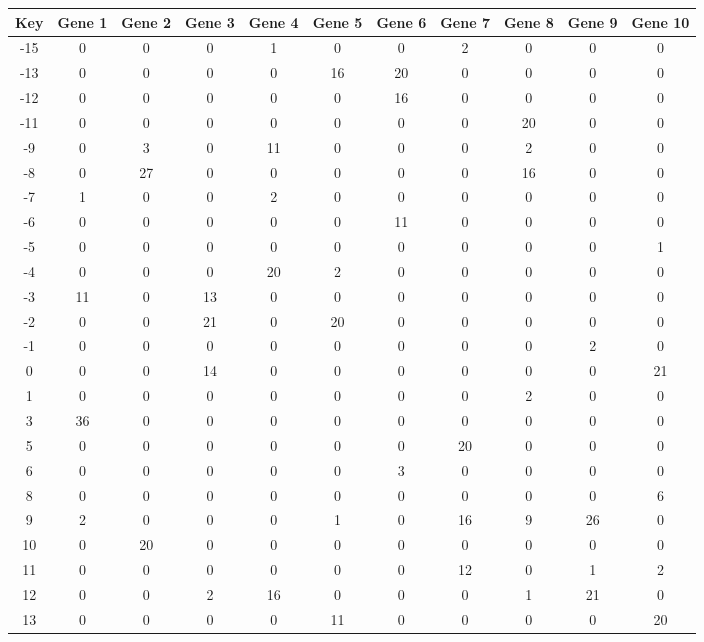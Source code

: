 \begin{tabular}{|c|c|c|c|c|c|c|c|c|c|c|}
\hline
Key & Gene 1 & Gene 2 & Gene 3 & Gene 4 & Gene 5 & Gene 6 & Gene 7 & Gene 8 & Gene 9 & Gene 10 \\
\hline
-15 & 0 & 0 & 0 & 1 & 0 & 0 & 2 & 0 & 0 & 0 \\
-13 & 0 & 0 & 0 & 0 & 16 & 20 & 0 & 0 & 0 & 0 \\
-12 & 0 & 0 & 0 & 0 & 0 & 16 & 0 & 0 & 0 & 0 \\
-11 & 0 & 0 & 0 & 0 & 0 & 0 & 0 & 20 & 0 & 0 \\
-9 & 0 & 3 & 0 & 11 & 0 & 0 & 0 & 2 & 0 & 0 \\
-8 & 0 & 27 & 0 & 0 & 0 & 0 & 0 & 16 & 0 & 0 \\
-7 & 1 & 0 & 0 & 2 & 0 & 0 & 0 & 0 & 0 & 0 \\
-6 & 0 & 0 & 0 & 0 & 0 & 11 & 0 & 0 & 0 & 0 \\
-5 & 0 & 0 & 0 & 0 & 0 & 0 & 0 & 0 & 0 & 1 \\
-4 & 0 & 0 & 0 & 20 & 2 & 0 & 0 & 0 & 0 & 0 \\
-3 & 11 & 0 & 13 & 0 & 0 & 0 & 0 & 0 & 0 & 0 \\
-2 & 0 & 0 & 21 & 0 & 20 & 0 & 0 & 0 & 0 & 0 \\
-1 & 0 & 0 & 0 & 0 & 0 & 0 & 0 & 0 & 2 & 0 \\
0 & 0 & 0 & 14 & 0 & 0 & 0 & 0 & 0 & 0 & 21 \\
1 & 0 & 0 & 0 & 0 & 0 & 0 & 0 & 2 & 0 & 0 \\
3 & 36 & 0 & 0 & 0 & 0 & 0 & 0 & 0 & 0 & 0 \\
5 & 0 & 0 & 0 & 0 & 0 & 0 & 20 & 0 & 0 & 0 \\
6 & 0 & 0 & 0 & 0 & 0 & 3 & 0 & 0 & 0 & 0 \\
8 & 0 & 0 & 0 & 0 & 0 & 0 & 0 & 0 & 0 & 6 \\
9 & 2 & 0 & 0 & 0 & 1 & 0 & 16 & 9 & 26 & 0 \\
10 & 0 & 20 & 0 & 0 & 0 & 0 & 0 & 0 & 0 & 0 \\
11 & 0 & 0 & 0 & 0 & 0 & 0 & 12 & 0 & 1 & 2 \\
12 & 0 & 0 & 2 & 16 & 0 & 0 & 0 & 1 & 21 & 0 \\
13 & 0 & 0 & 0 & 0 & 11 & 0 & 0 & 0 & 0 & 20 \\
\hline
\end{tabular}